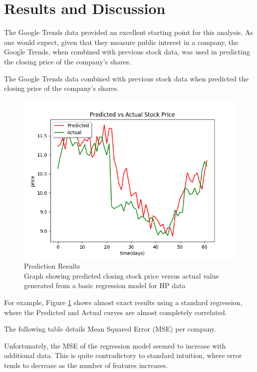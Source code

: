 \documentclass{article}
\begin{document}
\newpage
\section{Results and Discussion}

The Google Trends data provided an excellent starting point for this analysis. As one would expect, given that they measure public interest in a company, the Google Trends, when combined with previous stock data, was used in predicting the closing price of the company's shares. 

The Google Trends data combined with previous stock data when predicted the closing price of the company's shares. 

\begin{figure}[H]
	\centering
    \includegraphics[scale=0.5]{googleHP.png}
  \caption{Prediction Results \\
  \small Graph showing predicted closing stock price versus actual value generated from a basic regression model for HP data}
  \label{fig:googlehp}
\end{figure}
For example, Figure \ref{fig:googlehp} shows almost exact results using a standard regression, where the Predicted and Actual curves are almost completely correlated. 

The following table details Mean Squared Error (MSE) per company. 

Unfortunately, the MSE of the regression model seemed to increase with additional data. This is quite contradictory to standard intuition, where error tends to decrease as the number of features increases. 
\end{document}
